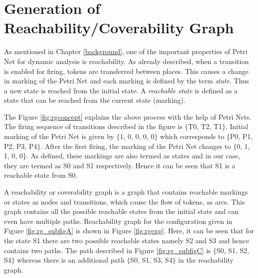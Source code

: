 \section{Generation of Reachability/Coverability Graph}
As mentioned in Chapter \ref{background}, one of the important properties of Petri Net for dynamic analysis is reachability. As already described, when a transition is enabled for firing, tokens are transferred between places. This causes a change in marking of the Petri Net and each marking is defined by the term \textit{state}. Thus a new state is reached from the initial state. A \textit{reachable state} is defined as a state that can be reached from the current state (marking).

The Figure \ref{fig:rgconcept} explains the above process with the help of Petri Nets. The firing sequence of transitions described in the figure is $ \lbrace $T0, T2, T1$ \rbrace $. Initial marking of the Petri Net is given by $ \lbrace $1, 0, 0, 0, 0$ \rbrace $ which corresponds to $ \lbrace $P0, P1, P2, P3, P4$ \rbrace $. After the first firing, the marking of the Petri Net changes to $ \lbrace $0, 1, 1, 0, 0$ \rbrace $. As defined, these markings are also termed as states and in our case, they are termed as S0 and S1 respectively. Hence it can be seen that S1 is a reachable state from S0.

A reachability or coverability graph is a graph that contains reachable markings or states as nodes and transitions, which cause the flow of tokens, as arcs. This graph contains all the possible reachable states from the initial state and can even have multiple paths. Reachability graph for the configuration given in Figure \ref{fig:rg_subfigA} is shown in Figure \ref{fig:rgexp}. Here, it can be seen that for the state S1 there are two possible reachable states namely S2 and S3 and hence contains two paths. The path described in Figure \ref{fig:rg_subfigC} is $ \lbrace $S0, S1, S2, S4$ \rbrace $ whereas there is an additional path $ \lbrace $S0, S1, S3, S4$ \rbrace $ in the reachability graph.

